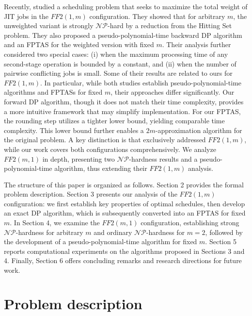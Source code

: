 \documentclass[12pt, eqno, limlimits]{article}
\begin{document}
\begin{sloppypar}
        Recently, \cite{HeegerHISShabtay2026} studied a scheduling problem that seeks to maximize the total weight of JIT jobs in the $FF2(1,m)$ configuration. They showed that for arbitrary $m$, the unweighted variant is strongly $\mathcal{NP}$-hard by a reduction from the Hitting Set problem. They also proposed a pseudo-polynomial-time backward DP algorithm and an FPTAS for the weighted version with fixed $m$. Their analysis further considered two special cases: (i) when the maximum processing time of any second-stage operation is bounded by a constant, and (ii) when the number of pairwise conflicting jobs is small. Some of their results are related to ours for $FF2(1,m)$. In particular, while both studies establish pseudo-polynomial-time algorithms and FPTASs for fixed $m$, their approaches differ significantly. Our forward DP algorithm, though it does not match their time complexity, provides a more intuitive framework that may simplify implementation. For our FPTAS, the rounding step utilizes a tighter lower bound, yielding comparable time complexity. This lower bound further enables a $2m$-approximation algorithm for the original problem. A key distinction is that \cite{HeegerHISShabtay2026} exclusively addressed $FF2(1,m)$, while our work covers both configurations comprehensively. We analyze $FF2(m,1)$ in depth, presenting two $\mathcal{NP}$-hardness results and a pseudo-polynomial-time algorithm, thus extending their $FF2(1,m)$ analysis.
        
        The structure of this paper is organized as follows. Section 2 provides the formal problem description. Section 3 presents our analysis of the $FF2(1,m)$ configuration: we first establish key properties of optimal schedules, then develop an exact DP algorithm, which is subsequently converted into an FPTAS for fixed $m$. In Section 4, we examine the $FF2(m,1)$ configuration, establishing strong $\mathcal{NP}$-hardness for arbitrary $m$ and ordinary $\mathcal{NP}$-hardness for $m=2$, followed by the development of a pseudo-polynomial-time algorithm for fixed $m$. Section 5 reports computational experiments on the algorithms proposed in Sections 3 and 4. Finally, Section 6 offers concluding remarks and research directions for future work.
        
        \section{Problem description}
        

\end{sloppypar}
\end{document}
